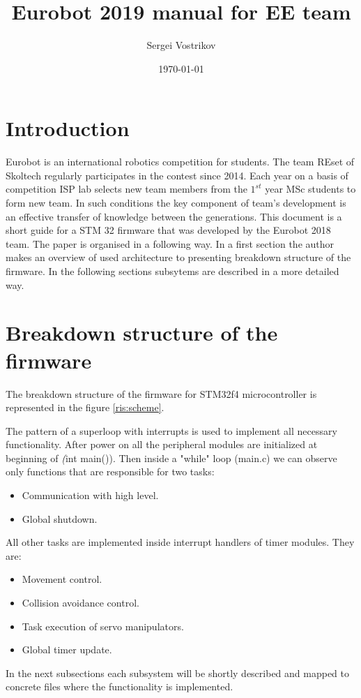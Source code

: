 \documentclass[a4paper,12pt]{article} %
\author{Sergei Vostrikov}
\title{Eurobot 2019 manual for EE team}
\date{\today}
\begin{document}

\maketitle

\newpage
\section*{Introduction}
Eurobot is an international robotics competition for students. The team REset of Skoltech regularly participates in the contest since 2014. Each year on a basis of competition ISP lab selects new team members from the $1^{st}$ year MSc students to form new team. In such conditions the key component of team's development is an effective transfer of knowledge between the generations. This document is a short guide for a STM 32 firmware that was developed by the Eurobot 2018 team. The paper is organised in a following way. In a first section the author makes an overview of used architecture to presenting breakdown structure of the firmware. In the following sections subsytems are described in a more detailed way.

\section{Breakdown structure of the firmware}
The breakdown structure of the firmware for STM32f4 microcontroller is represented in the figure \ref{ris:scheme}. 

The pattern of a superloop with interrupts is used to implement all necessary functionality. After power on all the peripheral modules are initialized at beginning of \textit(int main()). Then inside a "while" loop (main.c) we can observe only functions that are responsible for two tasks:
\begin{itemize}
	\item Communication with high level.
	\item Global shutdown.
\end{itemize}
All other tasks are implemented inside interrupt handlers of timer modules. They are:
\begin{itemize}
	\item Movement control.
	\item Collision avoidance control.
	\item Task execution of servo manipulators.
	\item Global timer update.
\end{itemize}
In the next subsections each subsystem will be shortly described and mapped to concrete files where the functionality is implemented.
\end{document}
